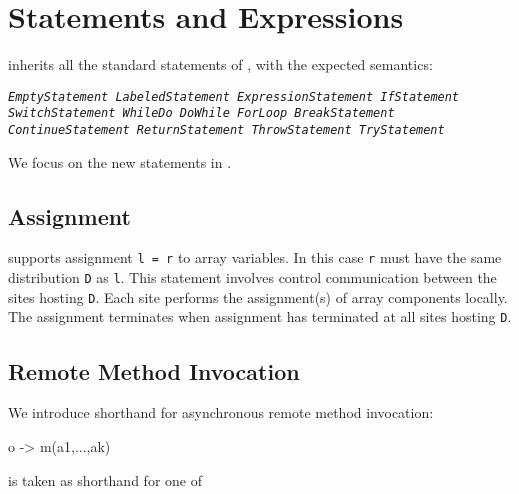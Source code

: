 \chapter{Statements and Expressions}\label{XtenStatements}

\Xten{} inherits all the standard statements of \Java{}, with the expected semantics:

\begin{x10}
\em\tt EmptyStatement      LabeledStatement  
\em\tt ExpressionStatement IfStatement
\em\tt SwitchStatement     WhileDo
\em\tt DoWhile             ForLoop           
\em\tt BreakStatement      ContinueStatement  
\em\tt ReturnStatement   ThrowStatement
\em\tt TryStatement
\end{x10}

We focus on the new statements in \Xten. 


\section{Assignment}\label{AssignmentStatement}

%

{}\Xten{} supports assignment {\tt l = r} to array variables. In this
case {\tt r} must have the same distribution {\tt D} as {\tt l}. This
statement involves control communication between the sites hosting
{\tt D}. Each site performs the assignment(s) of array components
locally. The assignment terminates when assignment has terminated at
all sites hosting {\tt D}.


\section{Remote Method Invocation}
We introduce shorthand for asynchronous remote method invocation:

\begin{x10}
   o -> m(a1,...,ak)
\end{x10}
\noindent is taken as shorthand for one of

